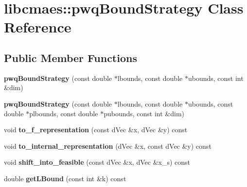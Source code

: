 \hypertarget{classlibcmaes_1_1pwqBoundStrategy}{\section{libcmaes\+:\+:pwq\+Bound\+Strategy Class Reference}
\label{classlibcmaes_1_1pwqBoundStrategy}
}
\subsection*{Public Member Functions}
\begin{DoxyCompactItemize}
\item 
\hypertarget{classlibcmaes_1_1pwqBoundStrategy_a37f4c3ff6a558e20fa6c80a5b59ce497}{{\bfseries pwq\+Bound\+Strategy} (const double $\ast$lbounds, const double $\ast$ubounds, const int \&dim)}\label{classlibcmaes_1_1pwqBoundStrategy_a37f4c3ff6a558e20fa6c80a5b59ce497}

\item 
\hypertarget{classlibcmaes_1_1pwqBoundStrategy_a211f627d589847afe171160a0928ecc7}{{\bfseries pwq\+Bound\+Strategy} (const double $\ast$lbounds, const double $\ast$ubounds, const double $\ast$plbounds, const double $\ast$pubounds, const int \&dim)}\label{classlibcmaes_1_1pwqBoundStrategy_a211f627d589847afe171160a0928ecc7}

\item 
\hypertarget{classlibcmaes_1_1pwqBoundStrategy_aebb3b92377ce6e90c34890420607c246}{void {\bfseries to\+\_\+f\+\_\+representation} (const d\+Vec \&x, d\+Vec \&y) const }\label{classlibcmaes_1_1pwqBoundStrategy_aebb3b92377ce6e90c34890420607c246}

\item 
\hypertarget{classlibcmaes_1_1pwqBoundStrategy_ab742d773ac7cd6dba47bfff7b03d213f}{void {\bfseries to\+\_\+internal\+\_\+representation} (d\+Vec \&x, const d\+Vec \&y) const }\label{classlibcmaes_1_1pwqBoundStrategy_ab742d773ac7cd6dba47bfff7b03d213f}

\item 
\hypertarget{classlibcmaes_1_1pwqBoundStrategy_a7fce5a91cf5a8f4c1b7b0743b58d4e6e}{void {\bfseries shift\+\_\+into\+\_\+feasible} (const d\+Vec \&x, d\+Vec \&x\+\_\+s) const }\label{classlibcmaes_1_1pwqBoundStrategy_a7fce5a91cf5a8f4c1b7b0743b58d4e6e}

\item 
\hypertarget{classlibcmaes_1_1pwqBoundStrategy_a8f16e0a370f358bf82517b566763b8f1}{double {\bfseries get\+L\+Bound} (const int \&k) const }\label{classlibcmaes_1_1pwqBoundStrategy_a8f16e0a370f358bf82517b566763b8f1}


\end{DoxyCompactItemize}
